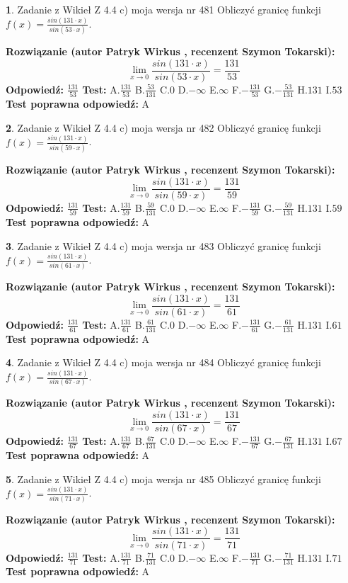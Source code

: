 \documentclass[12pt, a4paper]{article}
\theoremstyle{definition} %
\newtheorem{zad}{}
\newcommand{\zadStart}[1]{\begin{zad}#1\newline}
\newcommand{\zadStop}{\end{zad}}
\newcommand{\rozwStart}[2]{\noindent \textbf{Rozwiązanie (autor #1 , recenzent #2): }\newline}
\newcommand{\rozwStop}{\newline}
\newcommand{\odpStart}{\noindent \textbf{Odpowiedź:}\newline}
\newcommand{\odpStop}{\newline}
\newcommand{\testStart}{\noindent \textbf{Test:}\newline}
\newcommand{\testStop}{\newline}
\newcommand{\kluczStart}{\noindent \textbf{Test poprawna odpowiedź:}\newline}
\newcommand{\kluczStop}{\newline}
\begin{document}
\zadStart{Zadanie z Wikieł Z 4.4 c) moja wersja nr 481}
Obliczyć granicę funkcji $f(x)=\frac{sin(131\cdot x)}{sin(53\cdot x)}$.
\zadStop
\rozwStart{Patryk Wirkus}{Szymon Tokarski}
$$\lim\limits_{x\to 0}\frac{sin(131\cdot x)}{sin(53\cdot x)}=
\frac{131}{53}$$
\rozwStop
\odpStart
$\frac{131}{53}$
\odpStop
\testStart
A.$\frac{131}{53}$
B.$\frac{53}{131}$
C.$0$
D.$-\infty$
E.$\infty$
F.$-\frac{131}{53}$
G.$-\frac{53}{131}$
H.$131$
I.$53$
\testStop
\kluczStart
A
\kluczStop



\zadStart{Zadanie z Wikieł Z 4.4 c) moja wersja nr 482}
Obliczyć granicę funkcji $f(x)=\frac{sin(131\cdot x)}{sin(59\cdot x)}$.
\zadStop
\rozwStart{Patryk Wirkus}{Szymon Tokarski}
$$\lim\limits_{x\to 0}\frac{sin(131\cdot x)}{sin(59\cdot x)}=
\frac{131}{59}$$
\rozwStop
\odpStart
$\frac{131}{59}$
\odpStop
\testStart
A.$\frac{131}{59}$
B.$\frac{59}{131}$
C.$0$
D.$-\infty$
E.$\infty$
F.$-\frac{131}{59}$
G.$-\frac{59}{131}$
H.$131$
I.$59$
\testStop
\kluczStart
A
\kluczStop



\zadStart{Zadanie z Wikieł Z 4.4 c) moja wersja nr 483}
Obliczyć granicę funkcji $f(x)=\frac{sin(131\cdot x)}{sin(61\cdot x)}$.
\zadStop
\rozwStart{Patryk Wirkus}{Szymon Tokarski}
$$\lim\limits_{x\to 0}\frac{sin(131\cdot x)}{sin(61\cdot x)}=
\frac{131}{61}$$
\rozwStop
\odpStart
$\frac{131}{61}$
\odpStop
\testStart
A.$\frac{131}{61}$
B.$\frac{61}{131}$
C.$0$
D.$-\infty$
E.$\infty$
F.$-\frac{131}{61}$
G.$-\frac{61}{131}$
H.$131$
I.$61$
\testStop
\kluczStart
A
\kluczStop



\zadStart{Zadanie z Wikieł Z 4.4 c) moja wersja nr 484}
Obliczyć granicę funkcji $f(x)=\frac{sin(131\cdot x)}{sin(67\cdot x)}$.
\zadStop
\rozwStart{Patryk Wirkus}{Szymon Tokarski}
$$\lim\limits_{x\to 0}\frac{sin(131\cdot x)}{sin(67\cdot x)}=
\frac{131}{67}$$
\rozwStop
\odpStart
$\frac{131}{67}$
\odpStop
\testStart
A.$\frac{131}{67}$
B.$\frac{67}{131}$
C.$0$
D.$-\infty$
E.$\infty$
F.$-\frac{131}{67}$
G.$-\frac{67}{131}$
H.$131$
I.$67$
\testStop
\kluczStart
A
\kluczStop



\zadStart{Zadanie z Wikieł Z 4.4 c) moja wersja nr 485}
Obliczyć granicę funkcji $f(x)=\frac{sin(131\cdot x)}{sin(71\cdot x)}$.
\zadStop
\rozwStart{Patryk Wirkus}{Szymon Tokarski}
$$\lim\limits_{x\to 0}\frac{sin(131\cdot x)}{sin(71\cdot x)}=
\frac{131}{71}$$
\rozwStop
\odpStart
$\frac{131}{71}$
\odpStop
\testStart
A.$\frac{131}{71}$
B.$\frac{71}{131}$
C.$0$
D.$-\infty$
E.$\infty$
F.$-\frac{131}{71}$
G.$-\frac{71}{131}$
H.$131$
I.$71$
\testStop
\kluczStart
A
\kluczStop
\end{document}
